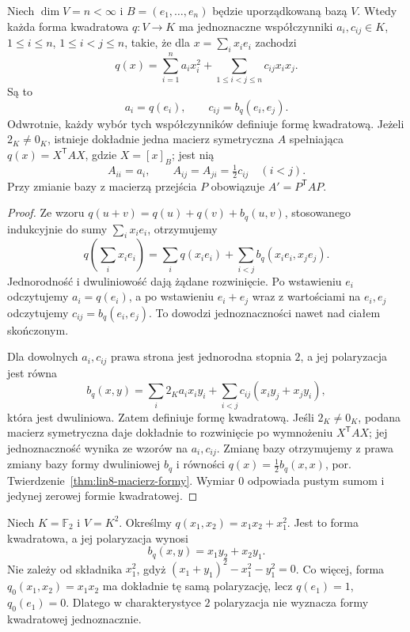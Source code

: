 \begin{twierdzenie}
\label{thm:lin9-macierz-kwadratowej}
Niech \(\dim V=n<\infty\)
i \(B=(e_1,\ldots,e_n)\)
będzie uporządkowaną bazą \(V\).
Wtedy każda forma kwadratowa
\(q\colon V\to K\)
ma jednoznaczne współczynniki
\(a_i,c_{ij}\in K\),
\(1\leq i\leq n\),
\(1\leq i<j\leq n\),
takie, że dla
\(x=\sum_i x_ie_i\)
zachodzi
\[
 q(x)=\sum_{i=1}^{n}a_ix_i^2+
       \sum_{1\leq i<j\leq n}
                         c_{ij}x_ix_j.
\]
Są to
\[
 a_i=q(e_i),\qquad
 c_{ij}=b_q(e_i,e_j).
\]
Odwrotnie, każdy wybór
tych współczynników definiuje
formę kwadratową.
Jeżeli \(2_K\ne0_K\),
istnieje dokładnie jedna
macierz symetryczna \(A\)
spełniająca \(q(x)=X^{\mathsf T}AX\),
gdzie \(X=[x]_B\); jest nią
\[
 A_{ii}=a_i,\qquad
 A_{ij}=A_{ji}=\tfrac12c_{ij}
 \quad(i<j).
\]
Przy zmianie bazy z macierzą
przejścia \(P\) obowiązuje
\(A'=P^{\mathsf T}AP\).
\end{twierdzenie}
\begin{proof}
Ze wzoru
\(q(u+v)=q(u)+q(v)+b_q(u,v)\),
stosowanego indukcyjnie
do sumy \(\sum_i x_ie_i\),
otrzymujemy
\[
 q\!\left(\sum_i x_ie_i\right)
 =\sum_i q(x_ie_i)+
  \sum_{i<j}b_q(x_ie_i,x_je_j).
\]
Jednorodność i dwuliniowość
dają żądane rozwinięcie.
Po wstawieniu \(e_i\)
odczytujemy \(a_i=q(e_i)\),
a po wstawieniu \(e_i+e_j\)
wraz z wartościami na \(e_i,e_j\)
odczytujemy
\(c_{ij}=b_q(e_i,e_j)\).
To dowodzi jednoznaczności
nawet nad ciałem skończonym.

Dla dowolnych \(a_i,c_{ij}\)
prawa strona jest jednorodna
stopnia \(2\), a jej polaryzacja
jest równa
\[
 b_q(x,y)=\sum_i2_Ka_ix_iy_i+
 \sum_{i<j}c_{ij}(x_iy_j+x_jy_i),
\]
która jest dwuliniowa.
Zatem definiuje formę
kwadratową.
Jeśli \(2_K\ne0_K\), podana
macierz symetryczna daje
dokładnie to rozwinięcie
po wymnożeniu
\(X^{\mathsf T}AX\);
jej jednoznaczność wynika
ze wzorów na \(a_i,c_{ij}\).
Zmianę bazy otrzymujemy
z prawa zmiany bazy formy
dwuliniowej \(b_q\) i równości
\(q(x)=\tfrac12b_q(x,x)\),
por. Twierdzenie~\ref{thm:lin8-macierz-formy}.
Wymiar \(0\) odpowiada
pustym sumom i jedynej
zerowej formie kwadratowej.
\end{proof}

\begin{przyklad}
\label{prz:lin9-char2-polar}
Niech \(K=\mathbb F_2\) i
\(V=K^2\). Określmy
\(q(x_1,x_2)=x_1x_2+x_1^2\).
Jest to forma kwadratowa,
a jej polaryzacja wynosi
\[
 b_q(x,y)=x_1y_2+x_2y_1.
\]
Nie zależy od składnika
\(x_1^2\), gdyż
\((x_1+y_1)^2-x_1^2-y_1^2=0\).
Co więcej, forma
\(q_0(x_1,x_2)=x_1x_2\)
ma dokładnie tę samą
polaryzację, lecz
\(q(e_1)=1\), \(q_0(e_1)=0\).
Dlatego w charakterystyce \(2\)
polaryzacja nie wyznacza
formy kwadratowej jednoznacznie.
\end{przyklad}


